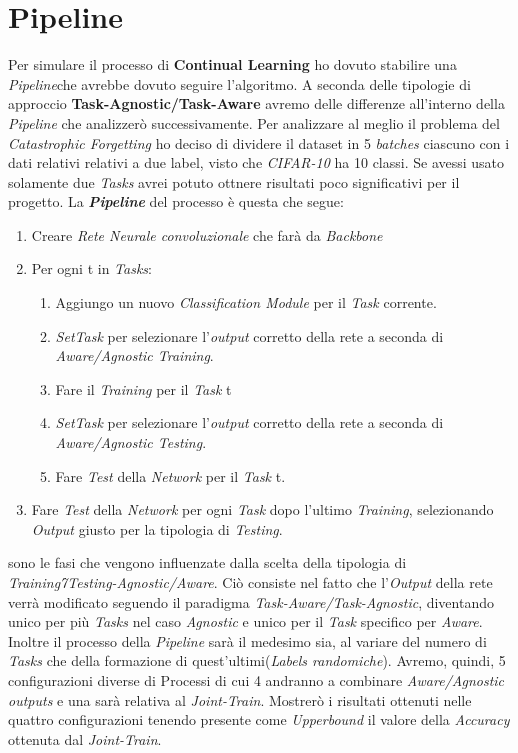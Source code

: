 \section{Pipeline}
Per simulare il processo di \textbf{Continual Learning} ho dovuto stabilire una \textit{Pipeline}che avrebbe dovuto seguire l'algoritmo. A seconda delle tipologie di approccio 
\textbf{Task-Agnostic/Task-Aware} avremo delle differenze all'interno della \textit{Pipeline} che analizzerò successivamente.
\newline
Per analizzare al meglio il problema del \textit{Catastrophic Forgetting}
ho deciso di dividere il dataset in 5 \textit{batches} ciascuno con i dati relativi relativi a due label, visto che \textit{CIFAR-10} ha 10 classi. Se avessi usato solamente due \textit{Tasks} avrei potuto ottnere risultati poco significativi per il progetto.
\newpage
La \textbf{\textit{Pipeline}} del processo è questa che segue:
\begin{enumerate}
    \item Creare \textit{Rete Neurale convoluzionale}  che farà da \textit{Backbone}
    \item Per ogni t in \textit{Tasks}:
    \begin{enumerate}
        \item Aggiungo un nuovo \textit{Classification Module} per il \textit{Task} corrente.
        \item \textit{SetTask} per selezionare l'\textit{output} corretto della rete a seconda di  \textit{Aware/Agnostic Training}. 
        \item Fare il \textit{Training} per il \textit{Task} t
        \item \textit{SetTask} per selezionare l'\textit{output} corretto della rete a seconda di  \textit{Aware/Agnostic Testing}.
        \item Fare \textit{Test} della \textit{Network} per il \textit{Task} t.
     \end{enumerate}
    \item Fare \textit{Test} della \textit{Network} per ogni \textit{Task} dopo l'ultimo \textit{Training}, selezionando \textit{Output} giusto per la tipologia di \textit{Testing}.
\end{enumerate}
 sono le fasi che vengono influenzate dalla scelta della tipologia di \textit{Training7Testing-Agnostic/Aware}. Ciò consiste nel fatto che l'\textit{Output} della rete verrà modificato seguendo il paradigma \textit{Task-Aware/Task-Agnostic}, diventando unico per più \textit{Tasks} nel caso \textit{Agnostic} e unico per il \textit{Task} specifico per \textit{Aware}.\newline
Inoltre il processo della \textit{Pipeline} sarà il medesimo sia, al variare del numero di \textit{Tasks} che della formazione di quest'ultimi(\textit{Labels randomiche}).\newline
Avremo, quindi, 5 configurazioni diverse di Processi di cui 4 andranno a combinare \textit{Aware/Agnostic outputs} e una sarà relativa al \textit{Joint-Train}.\newline
Mostrerò i risultati ottenuti nelle quattro configurazioni tenendo presente come \textit{Upperbound} il valore della \textit{Accuracy} ottenuta dal \textit{Joint-Train}.
\newpage

